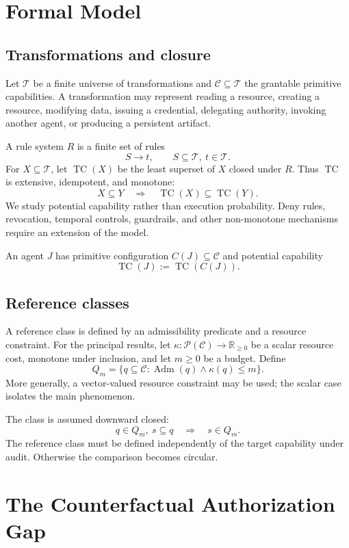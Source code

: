 \documentclass[11pt]{article}
\newcommand{\TC}{\operatorname{TC}}
\newcommand{\Adm}{\operatorname{Adm}}
\newcommand{\Pow}{\mathcal P}
\newcommand{\Cset}{\mathcal C}
\newcommand{\Tset}{\mathcal T}
\begin{document}
\section{Formal Model}

\subsection{Transformations and closure}

Let $\Tset$ be a finite universe of transformations and $\Cset\subseteq\Tset$ the grantable primitive capabilities. A transformation may represent reading a resource, creating a resource, modifying data, issuing a credential, delegating authority, invoking another agent, or producing a persistent artifact.

A rule system $R$ is a finite set of rules
\[
S\rightarrow t,
\qquad S\subseteq\Tset,\ t\in\Tset.
\]
For $X\subseteq\Tset$, let $\TC(X)$ be the least superset of $X$ closed under $R$. Thus $\TC$ is extensive, idempotent, and monotone:
\[
X\subseteq Y\quad\Longrightarrow\quad\TC(X)\subseteq\TC(Y).
\]
We study potential capability rather than execution probability. Deny rules, revocation, temporal controls, guardrails, and other non-monotone mechanisms require an extension of the model.

An agent $J$ has primitive configuration $C(J)\subseteq\Cset$ and potential capability
\[
\TC(J):=\TC(C(J)).
\]

\subsection{Reference classes}

A reference class is defined by an admissibility predicate and a resource constraint. For the principal results, let $\kappa:\Pow(\Cset)\to\mathbb R_{\ge0}$ be a scalar resource cost, monotone under inclusion, and let $m\ge0$ be a budget. Define
\[
Q_m=\{q\subseteq\Cset:\Adm(q)\land \kappa(q)\le m\}.
\]
More generally, a vector-valued resource constraint may be used; the scalar case isolates the main phenomenon.

The class is assumed downward closed:
\[
q\in Q_m,\ s\subseteq q
\quad\Longrightarrow\quad s\in Q_m.
\]
The reference class must be defined independently of the target capability under audit. Otherwise the comparison becomes circular.

\section{The Counterfactual Authorization Gap}
\end{document}
